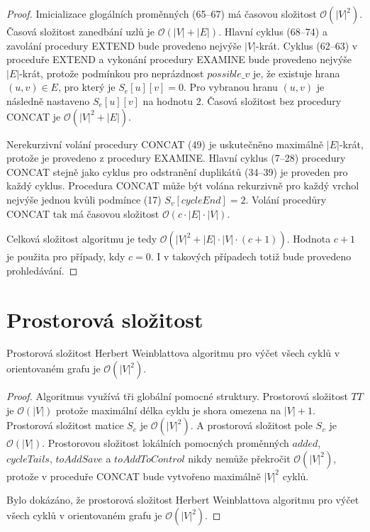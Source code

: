         \begin{proof}
            Imicializace glogálních proměnných (65--67) má časovou složitost $\mathcal{O}(|V|^2)$. Časová složitost zanedbání uzlů je $\mathcal{O}(|V| + |E|)$. Hlavní cyklus (68--74) a zavolání procedury EXTEND bude provedeno nejvýše $|V|$-krát. Cyklus (62--63) v proceduře EXTEND a vykonání procedury EXAMINE bude provedeno nejvýše $|E|$-krát, protože podmínkou pro neprázdnost $possible\_v$ je, že existuje hrana $(u, v) \in E$, pro který je $S_e[u][v] = 0$. Pro vybranou hranu $(u, v)$ je následně nastaveno $S_e[u][v]$ na hodnotu $2$. Časová složitost bez procedury CONCAT je $\mathcal{O}(|V|^2 + |E|)$.

            Nerekurzivní volání procedury CONCAT (49) je uskutečněno maximálně $|E|$-krát, protože je provedeno z procedury EXAMINE. Hlavní cyklus (7--28) procedury CONCAT stejně jako cyklus pro odstranění duplikátů (34--39) je proveden pro každý cyklus. Procedura CONCAT může být volána rekurzivně pro každý vrchol nejvýše jednou kvůli podmínce (17) $S_v[cycleEnd] = 2$. Volání procedůry CONCAT tak má časovou složitost $\mathcal{O}(c \cdot |E| \cdot |V|)$.

            Celková složitost algoritmu je tedy $\mathcal{O}(|V|^2 + |E|\cdot|V|\cdot(c + 1))$. Hodnota $c + 1$ je použita pro případy, kdy $c = 0$. I v takových případech totiž bude provedeno prohledávání.
        \end{proof}

    \section{Prostorová složitost}
        \begin{theorem}
            Prostorová složitost Herbert Weinblattova algoritmu pro výčet všech cyklů v orientovaném grafu je $\mathcal{O}(|V|^2)$.
        \end{theorem}

        \begin{proof}
            Algoritmus využívá tři globální pomocné struktury. Prostorová složitost $TT$ je $\mathcal{O}(|V|)$ protože maximální délka cyklu je shora omezena na $|V| + 1$. Prostorová složitost matice $S_e$ je $\mathcal{O}(|V|^2)$. A prostorová složitost pole $S_v$ je $\mathcal{O}(|V|)$. Prostorovou složitost lokálních pomocných proměnných $added$, $cycleTails$, $toAddSave$ a $toAddToControl$ nikdy nemůže překročit $\mathcal{O}(|V|^2)$, protože v proceduře CONCAT bude vytvořeno maximálně $|V|^2$ cyklů.

            Bylo dokázáno, že prostorová složitost Herbert Weinblattova algoritmu pro výčet všech cyklů v orientovaném grafu je $\mathcal{O}(|V|^2)$.
        \end{proof}

